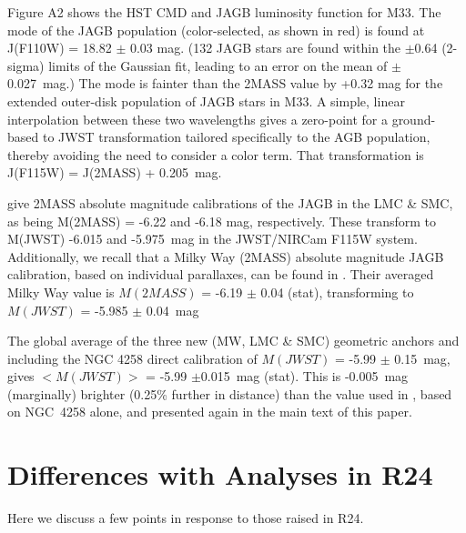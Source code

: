 \documentclass[12pt,modern]{aastex631}
\begin{document}
Figure A2 shows the HST CMD and JAGB luminosity function for M33. The mode of the JAGB population (color-selected, as shown in red) is found at J(F110W) = 18.82 $\pm$ 0.03 mag. (132 JAGB stars are found within the $\pm$0.64 (2-sigma) limits of the Gaussian fit, leading to an error on the mean of $\pm$0.027~mag.) The mode is fainter than the 2MASS value by +0.32 mag for the extended outer-disk population of JAGB stars in M33. A simple, linear interpolation between these two wavelengths gives a zero-point for a ground-based to JWST transformation tailored specifically to the AGB population, thereby avoiding the need to consider a color term. That transformation is J(F115W) = J(2MASS) + 0.205~mag.

\citet{madore_freedman_2020} give 2MASS absolute magnitude calibrations of the JAGB in the LMC \& SMC, as being M(2MASS) = -6.22 and -6.18 mag, respectively. These transform to M(JWST) -6.015 and -5.975~mag in the JWST/NIRCam F115W system. Additionally, we recall that a Milky Way (2MASS) absolute magnitude JAGB calibration, based on individual parallaxes, can be found in \citet{madore_2022}.   
Their averaged Milky Way value is $M(2MASS)$ = -6.19 $\pm$ 0.04 (stat), transforming to $M(JWST)$ = -5.985 $\pm$ 0.04~mag  

The global average of the three new (MW, LMC \& SMC) geometric anchors and including the NGC 4258 direct calibration of $M(JWST)$ = -5.99 $\pm$ 0.15~mag, gives $<M(JWST)>$ = -5.99 $\pm$0.015~mag (stat). This is -0.005~mag (marginally) brighter (0.25\% further in distance) than the value used in \citep{lee_2024a}, based on NGC~4258 alone, and presented again in the main text of this paper. 


\section{Differences with Analyses in R24} 
\label{App:AppendixB}



Here we discuss a few points in response to those raised in R24.
\end{document}
